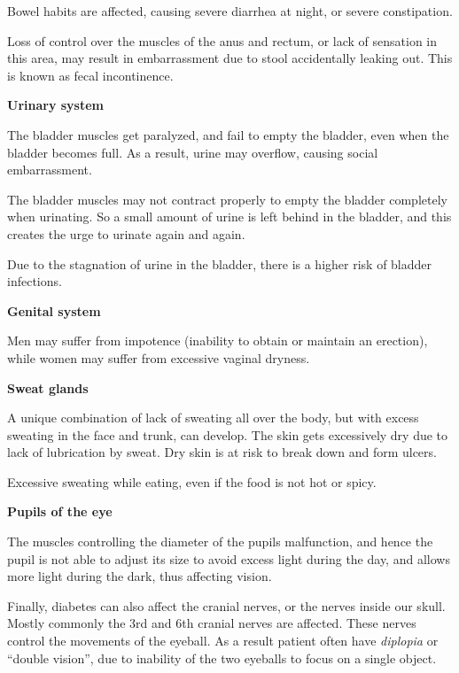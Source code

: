  \item Bowel habits are affected, causing severe diarrhea at night, or severe constipation.

 \item Loss of control over the muscles of the anus and rectum, or lack of sensation in this area, may result in embarrassment due to stool accidentally leaking out. This is known as fecal incontinence.


 \item \textbf{Urinary system}
 \item The bladder muscles get paralyzed, and fail to empty the bladder, even when the bladder becomes full. As a result, urine may overflow, causing social embarrassment.

 \item The bladder muscles may not contract properly to empty the bladder completely when urinating. So a small amount of urine is left behind in the bladder, and this creates the urge to urinate again and again.

 \item Due to the stagnation of urine in the bladder, there is a higher risk of bladder infections.


 \item \textbf{Genital system}
 \item Men may suffer from impotence (inability to obtain or maintain an erection), while women may suffer from excessive vaginal dryness.


 \item \textbf{Sweat glands}
 \item A unique combination of lack of sweating all over the body, but with excess sweating in the face and trunk, can develop. The skin gets excessively dry due to lack of lubrication by sweat. Dry skin is at risk to break down and form ulcers.

 \item Excessive sweating while eating, even if the food is not hot or spicy.


 \item \textbf{Pupils of the eye}
 \item The muscles controlling the diameter of the pupils malfunction, and hence the pupil is not able to adjust its size to avoid excess light during the day, and allows more light during the dark, thus affecting vision.



Finally, diabetes can also affect the cranial nerves, or the nerves inside our skull. Mostly commonly the 3rd and 6th cranial nerves are affected. These nerves control the movements of the eyeball. As a result patient often have \textit{diplopia} or “double vision”, due to inability of the two eyeballs to focus on a single object.

